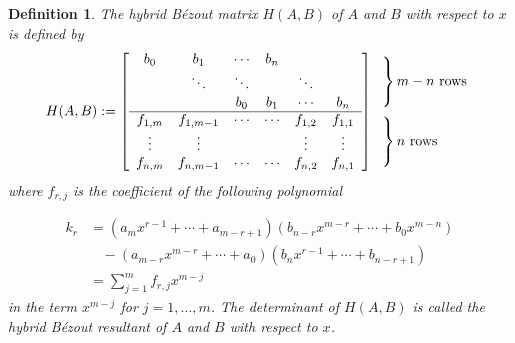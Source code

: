 \documentclass{article}
\newtheorem{definition}[theorem]{Definition}
\begin{document}
\begin{definition}
  The hybrid B\'ezout matrix $H(A,B)$ of $A$ and $B$ with respect to $x$ is defined by
  $${{H}}({A},{B}): = \left[ {\begin{array}{*{20}{c}}
{{b_{0}}}&b_1 &\cdots &{{b_{n}}}&{}\\
{}& \ddots &\ddots&& \ddots &{}\\
{}&{}&{{b_{0}}}& b_1&\cdots &{{b_{n}}}\\
\hline
f_{1,{m}}&f_{1,{m} - 1}& \cdots &\cdots &f_{1,2}&f_{1,1}\\
 \vdots & \vdots &{}& &\vdots & \vdots \\
f_{{n},{m}}&f_{{n},{m} - 1}&\cdots & \cdots &f_{{n},2}&f_{{n},1}
\end{array}} \right]\hspace{-1em}
\begin{array}{l}
\left.
\begin{array}{l}
\\[25pt]
\end{array}
\right\}m-n\text{~rows}\\[18pt]
\left.
\begin{array}{l}
\\[25pt]
\end{array}
\right\}n\text{~rows}
\end{array}
$$
where $f_{r,j}$ is the  coefficient of the following polynomial


\begin{align*}
  k_r^{} &= ({a_{{m}}}{x^{r - 1}} +  \cdots  + {a_{m- r + 1}})({b_{{n} - r}}{x^{m- r}} +  \cdots  + {b_{0}}{x^{m- {n}}})\\
&\ \ \ \ - ({a_{m- r}}{x^{m- r}} +  \cdots  + {a_0})({b_{{n}}}{x^{r - 1}} +  \cdots  + {b_{n- r + 1}})\\
&= \sum\limits_{j = 1}^{{m}} {f_{r,j}{x^{m- j}}}
\end{align*}
in the term $x^{m-j}$ for $j=1,\ldots,m$. The determinant of ${H}(A,{B})$ is called the hybrid B\'ezout resultant of $A$ and $B$ with respect to $x$.

\end{definition}
\end{document}
